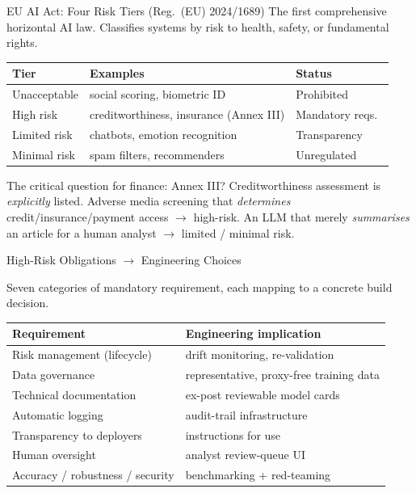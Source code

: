 \documentclass[9pt,t]{beamer}
\begin{document}
\begin{frame}{EU AI Act: Four Risk Tiers (Reg.\ (EU) 2024/1689)}
The first comprehensive horizontal AI law. Classifies systems by risk to
health, safety, or fundamental rights.

\medskip
\begin{tabular}{lll}
\toprule
\textbf{Tier} & \textbf{Examples} & \textbf{Status} \\
\midrule
Unacceptable & social scoring, biometric ID & Prohibited \\
High risk    & creditworthiness, insurance (Annex III) & Mandatory reqs.\ \\
Limited risk & chatbots, emotion recognition & Transparency \\
Minimal risk & spam filters, recommenders & Unregulated \\
\bottomrule
\end{tabular}

\medskip
\begin{alertblock}{The critical question for finance: Annex III?}
Creditworthiness assessment is \emph{explicitly} listed. Adverse media
screening that \emph{determines} credit/insurance/payment access $\to$
high-risk. An LLM that merely \emph{summarises} an article for a human analyst
$\to$ limited / minimal risk.
\end{alertblock}
\end{frame}

\begin{frame}{High-Risk Obligations $\to$ Engineering Choices}
\begin{underhood}
Seven categories of mandatory requirement, each mapping to a concrete build
decision.
\end{underhood}

\medskip
\begin{tabular}{ll}
\toprule
\textbf{Requirement} & \textbf{Engineering implication} \\
\midrule
Risk management (lifecycle) & drift monitoring, re-validation \\
Data governance & representative, proxy-free training data \\
Technical documentation & ex-post reviewable model cards \\
Automatic logging & audit-trail infrastructure \\
Transparency to deployers & instructions for use \\
Human oversight & analyst review-queue UI \\
Accuracy / robustness / security & benchmarking + red-teaming \\
\bottomrule
\end{tabular}
\end{frame}
\end{document}
